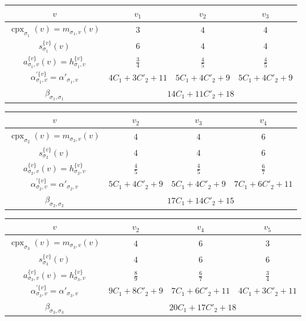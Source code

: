 \begin{table}[ht]
  \centering

{\renewcommand\arraystretch{1.3}
\begin{tabular}{c||ccc}
    \hline
    $v$ & $v_1$ & $v_2$ & $v_3$ \\ 
    \hline \hline
    $\operatorname{cpx}_{\sigma _1} (v) = m_{\sigma _1, v} (v)$ & $3$ & $4$ & $4$ \\
   	$s_{\sigma _1} ^{\{ v \}}(v)$ & $6$ & $4$ & $4$ \\
	$a_{\sigma _1 , v}^{\{ v \}} (v) = h_{\sigma _1, v}^{\{ v \}}$ & $\frac{3}{4}$ & $\frac{4}{5}$ & $\frac{4}{5}$ \\
	$\alpha^{\prime \{ v \}} _{\sigma _1, v} = \alpha' _{\sigma _1, v}$ & $4C_1 + 3C'_2 + 11$ & $5C_1 + 4C'_2 + 9$ & $5C_1 + 4C'_2 + 9$ \\
	$\beta _{\sigma _1, \sigma _1}$ & \multicolumn{3}{c}{$14C_1 + 11C'_2 + 18$} \\
    \hline
\end{tabular}
}

\vspace{3mm}

{\renewcommand\arraystretch{1.3}
\begin{tabular}{c||ccc}
    \hline
    $v$ & $v_2$ & $v_3$ & $v_4$ \\ 
    \hline \hline
    $\operatorname{cpx}_{\sigma _2} (v) = m_{\sigma _2, v} (v)$ & $4$ & $4$ & $6$ \\
   	$s_{\sigma _2} ^{\{ v \}}(v)$ & $4$ & $4$ & $6$ \\
	$a_{\sigma _2, v}^{\{ v \}} (v) = h_{\sigma _2, v}^{\{ v \}}$ & $\frac{4}{5}$ & $\frac{4}{5}$ & $\frac{6}{7}$ \\
	$\alpha^{\prime \{ v \}} _{\sigma _2, v} = \alpha' _{\sigma _2, v}$ & $5C_1 + 4C'_2 + 9$ & $5C_1 + 4C'_2 + 9$ & $7C_1 + 6C'_2 + 11$ \\
	$\beta _{\sigma _2, \sigma _2}$ & \multicolumn{3}{c}{$17C_1 + 14C'_2 + 15$} \\
    \hline
\end{tabular}
}

\vspace{3mm}

{\renewcommand\arraystretch{1.3}
\begin{tabular}{c||ccc}
    \hline
    $v$ & $v_2$ & $v_4$ & $v_5$ \\ 
    \hline \hline
    $\operatorname{cpx}_{\sigma _3} (v) = m_{\sigma _3, v} (v)$ & $4$ & $6$ & $3$ \\
   	$s_{\sigma _3} ^{\{ v \}}(v)$ & $4$ & $6$ & $6$ \\
	$a_{\sigma _3, v}^{\{ v \}} (v) = h_{\sigma _3, v}^{\{ v \}}$ & $\frac{8}{9}$ & $\frac{6}{7}$ & $\frac{3}{4}$ \\
	$\alpha^{\prime \{ v \}} _{\sigma _3, v} = \alpha' _{\sigma _3, v}$ & $9C_1 + 8C'_2 + 9$ & $7C_1 + 6C'_2 + 11$ & $4C_1 + 3C'_2 + 11$ \\
	$\beta _{\sigma _3, \sigma _3}$ & \multicolumn{3}{c}{$20C_1 + 17C'_2 + 18$} \\
    \hline
\end{tabular}
}


\end{table}
